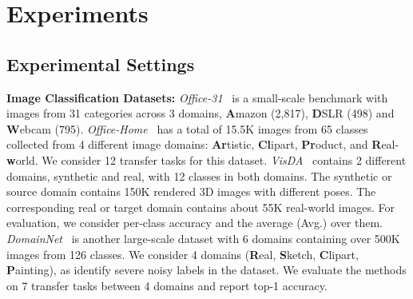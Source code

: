 \documentclass[10pt,twocolumn,letterpaper]{article}
\begin{document}
\section{Experiments}
\label{sec:experiments}
\subsection{Experimental Settings}
\noindent \textbf{Image Classification Datasets:} \emph{Office-31}~\cite{office31} is a small-scale benchmark with images from 31 categories across 3 domains, \textbf{A}mazon (2,817), \textbf{D}SLR (498) and \textbf{W}ebcam (795). \emph{Office-Home}~\cite{venkateswara2017deep} has a total of 15.5K images from 65 classes  collected from 4 different image domains: \textbf{Ar}tistic, \textbf{Cl}ipart, \textbf{Pr}oduct, and \textbf{R}eal-\textbf{w}orld. We consider 12 transfer tasks for this dataset. \emph{VisDA}~\cite{peng2017visda} contains 2 different domains, synthetic and real, with 12 classes in both domains. The synthetic or source domain contains 150K rendered 3D images with different poses. The corresponding real or target domain contains about 55K real-world images. For evaluation, we consider per-class accuracy and the average (Avg.) over them.  \emph{DomainNet}~\cite{peng2019moment} is another large-scale dataset with 6 domains containing over 500K images from 126 classes. We consider 4 domains (\textbf{R}eal, \textbf{S}ketch, \textbf{C}lipart, \textbf{P}ainting), as \cite{saito2019semi} identify severe noisy labels in the dataset. We evaluate the methods on 7 transfer tasks between 4 domains and report top-1 accuracy. 
\end{document}
